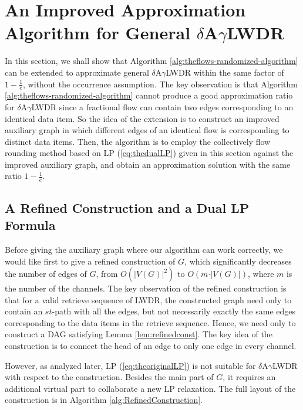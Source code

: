 \documentclass[11pt,english,onecolumn,draftcls]{IEEEtran}
\theoremstyle{plain}
\theoremstyle{plain}
\theoremstyle{plain}
\theoremstyle{plain}
\begin{document}
\section{An Improved Approximation Algorithm for General $\delta$A$\gamma$LWDR}

In this section, we shall show that Algorithm \ref{alg:theflows-randomized-algorithm}
can be extended to approximate general $\delta$A$\gamma$LWDR within
the same factor of $1-\frac{1}{e}$, without the occurrence assumption.
The key observation is that Algorithm \ref{alg:theflows-randomized-algorithm}
cannot produce a good approximation ratio for $\delta$A$\gamma$LWDR
since a fractional flow can contain two edges corresponding to an
identical data item. So the idea of the extension is to construct
an improved auxiliary graph in which different edges of an identical flow
is corresponding to distinct data items. Then, the algorithm is to
employ the collectively flow rounding method based on LP (\ref{eq:thedualLP})
given in this section against the improved auxiliary graph, and obtain
an approximation solution with the same ratio $1-\frac{1}{e}$.


\subsection{A Refined Construction and a Dual LP Formula}

Before giving the auxiliary graph where our algorithm can work correctly,
we would like first to give a refined construction of $G$, which
significantly decreases the number of edges of $G$, from $O(\vert V(G)\vert^{2})$
to $O(m\cdot\vert V(G)\vert)$, where $m$ is the number of the channels.
The key observation of the refined construction is that for a valid
retrieve sequence of LWDR, the constructed graph need only to contain
an $st$-path with all the edges, but not necessarily exactly the
same edges corresponding to the data items in the retrieve sequence.
Hence, we need only to construct a DAG satisfying Lemma \ref{lem:refinedconst}.
The key idea of the construction is to connect the head of an edge
to only one edge in every channel.

However, as analyzed later, LP (\ref{eq:theoriginalLP}) is not suitable
for $\delta$A$\gamma$LWDR with respect to the construction. Besides
the main part of $G$, it requires an additional virtual part to collaborate
a new LP relaxation. The full layout of the construction is in Algorithm
\ref{alg:RefinedConstruction}.
\end{document}
